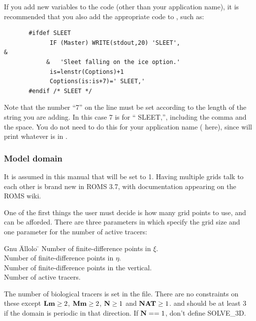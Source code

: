 If you add new  variables to the code (other than your
application name), it is recommended that you also add the appropriate
code to , such as:
\begin{verbatim}
       #ifdef SLEET
             IF (Master) WRITE(stdout,20) 'SLEET',                      &
            &   'Sleet falling on the ice option.'
             is=lenstr(Coptions)+1
             Coptions(is:is+7)=' SLEET,'
       #endif /* SLEET */
\end{verbatim}
Note that the number ``7'' on the  line must be set
according to the length of the string you are adding.  In this case 7
is for `` SLEET,'', including the comma and the space. You do not
need to do this for your application name ( here),
since  will print whatever is in .

\subsubsection{Model domain}
\label{Muddy}
It is assumed in this manual that  will be set to 1.
Having multiple grids talk to each other is brand new in ROMS 3.7,
with documentation appearing on the ROMS wiki.

One of the first things the user must decide is how many grid points
to use, and can be afforded.  There are three parameters in
 which specify the grid size and one parameter for the
number of active tracers:
\begin{tabbing}
  Gnu \= Allolo \= \kill
  \>  \> Number of finite-difference points in $\xi$. \\
  \>  \> Number of finite-difference points in $\eta$. \\
  \>  \> Number of finite-difference points in the vertical. \\
  \>  \> Number of active tracers. \\
\end{tabbing}
The number of biological tracers is set in the  file.
There are no constraints on these except $\mbox{\bf Lm} \geq 2$, $\mbox{\bf Mm}
\geq 2$, $\mbox{\bf N} \geq 1$ and $\mbox{\bf NAT} \geq 1$.   and
 should be at least 3 if the domain is periodic in that
direction. If $\mbox{\bf N} == 1$, don't define SOLVE\_3D.

